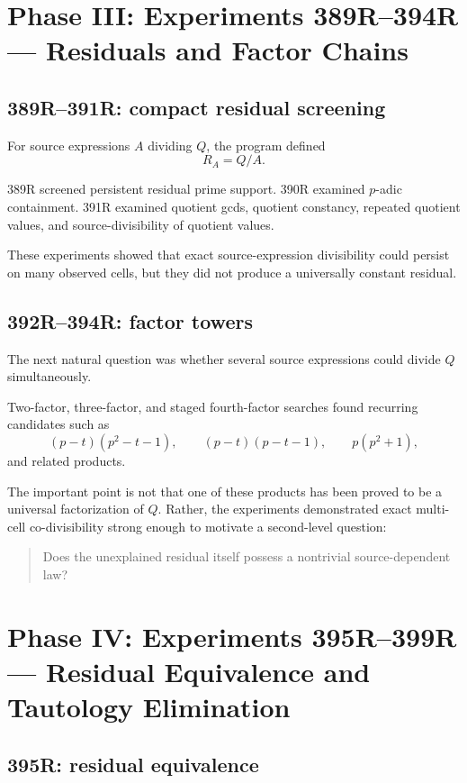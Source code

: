 \documentclass[11pt,a4paper]{article}
\begin{document}
\section{Phase III: Experiments 389R--394R --- Residuals and Factor Chains}

\subsection{389R--391R: compact residual screening}

For source expressions $A$ dividing $Q$, the program defined
\[
R_A=Q/A.
\]

389R screened persistent residual prime support. 390R examined $p$-adic containment. 391R examined quotient gcds, quotient constancy, repeated quotient values, and source-divisibility of quotient values.

These experiments showed that exact source-expression divisibility could persist on many observed cells, but they did not produce a universally constant residual.

\subsection{392R--394R: factor towers}

The next natural question was whether several source expressions could divide $Q$ simultaneously.

Two-factor, three-factor, and staged fourth-factor searches found recurring candidates such as
\[
(p-t)(p^2-t-1),
\qquad
(p-t)(p-t-1),
\qquad
p(p^2+1),
\]
and related products.

The important point is not that one of these products has been proved to be a universal factorization of $Q$. Rather, the experiments demonstrated exact multi-cell co-divisibility strong enough to motivate a second-level question:
\begin{quote}
Does the unexplained residual itself possess a nontrivial source-dependent law?
\end{quote}

\section{Phase IV: Experiments 395R--399R --- Residual Equivalence and Tautology Elimination}

\subsection{395R: residual equivalence}
\end{document}
